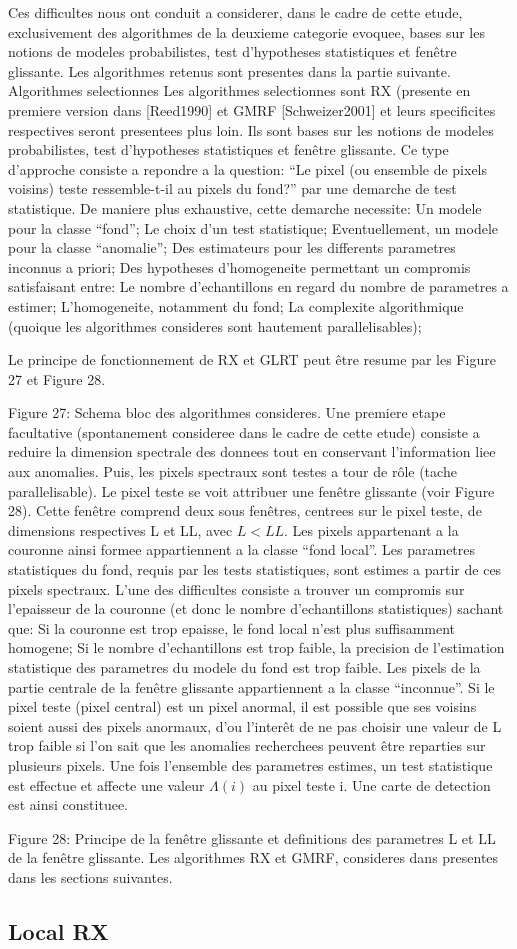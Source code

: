 Ces difficultes nous ont conduit a considerer, dans le cadre de cette
etude, exclusivement des algorithmes de la deuxieme categorie evoquee,
bases sur les notions de modeles probabilistes, test d'hypotheses
statistiques et fenêtre glissante. Les algorithmes retenus sont
presentes dans la partie suivante.  Algorithmes selectionnes Les
algorithmes selectionnes sont RX (presente en premiere version dans
[Reed1990] et GMRF [Schweizer2001] et leurs specificites respectives
seront presentees plus loin. Ils sont bases sur les notions de modeles
probabilistes, test d'hypotheses statistiques et fenêtre glissante.
Ce type d'approche consiste a repondre a la question: ``Le pixel (ou
  ensemble de pixels voisins) teste ressemble-t-il au pixels du
  fond?'' par une demarche de test statistique. De maniere plus
exhaustive, cette demarche necessite: Un modele pour la classe
``fond''; Le choix d'un test statistique; Eventuellement, un modele
pour la classe ``anomalie''; Des estimateurs pour les differents
parametres inconnus a priori; Des hypotheses d'homogeneite permettant
un compromis satisfaisant entre: Le nombre d'echantillons en regard du
nombre de parametres a estimer; L'homogeneite, notamment du fond; La
complexite algorithmique (quoique les algorithmes consideres sont
hautement parallelisables);

Le principe de fonctionnement de RX et GLRT peut être resume par les
Figure 27 et Figure 28.

Figure 27: Schema bloc des algorithmes consideres.  Une premiere etape
facultative (spontanement consideree dans le cadre de cette etude)
consiste a reduire la dimension spectrale des donnees tout en
conservant l'information liee aux anomalies. Puis, les pixels
spectraux sont testes a tour de rôle (tache parallelisable). Le pixel
teste se voit attribuer une fenêtre glissante (voir Figure 28). Cette
fenêtre comprend deux sous fenêtres, centrees sur le pixel teste, de
dimensions respectives L et LL, avec $L < LL$.  Les pixels appartenant a
la couronne ainsi formee appartiennent a la classe ``fond local''. Les
parametres statistiques du fond, requis par les tests statistiques,
sont estimes a partir de ces pixels spectraux. L'une des difficultes
consiste a trouver un compromis sur l'epaisseur de la couronne (et
donc le nombre d'echantillons statistiques) sachant que: Si la
couronne est trop epaisse, le fond local n'est plus suffisamment
homogene; Si le nombre d'echantillons est trop faible, la precision
de l'estimation statistique des parametres du modele du fond est trop
faible.  Les pixels de la partie centrale de la fenêtre glissante
appartiennent a la classe ``inconnue''. Si le pixel teste (pixel
central) est un pixel anormal, il est possible que ses voisins soient
aussi des pixels anormaux, d'ou l'interêt de ne pas choisir une valeur
de L trop faible si l'on sait que les anomalies recherchees peuvent
être reparties sur plusieurs pixels.  Une fois l'ensemble des
parametres estimes, un test statistique est effectue et affecte une
valeur $\Lambda(i)$ au pixel teste i. Une carte de detection est ainsi
constituee.

Figure 28: Principe de la fenêtre glissante et definitions des
parametres L et LL de la fenêtre glissante.  Les algorithmes RX et
GMRF, consideres dans presentes dans les sections suivantes.

\subsection{Local RX}
